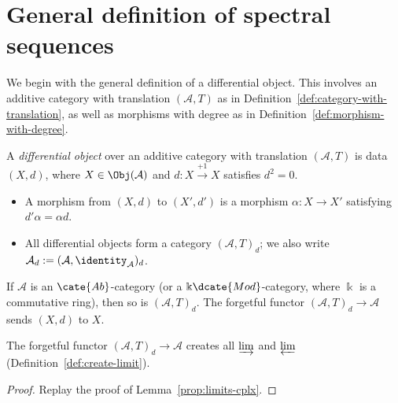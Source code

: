 
\section{General definition of spectral sequences}\label{sec:spectral-sequence}
\hypertarget{o014.aljabr2.chapter5.general-spectral-sequences}{ }

We begin with the general definition of a differential object. This involves an
additive category with translation $(\mathcal{A},T)$ as in
Definition~\ref{def:category-with-translation}, as well as morphisms with
degree as in Definition~\ref{def:morphism-with-degree}.

\begin{definition}\label{def:differential-object}
	A \emph{differential object} over an additive category with translation
	$(\mathcal{A},T)$ is data $(X,d)$, where $X\in\Obj(\mathcal{A})$ and
	$d:X\xrightarrow{+1}X$ satisfies $d^2=0$.
	\begin{itemize}
		\item A morphism from $(X,d)$ to $(X',d')$ is a morphism
		$\alpha:X\to X'$ satisfying $d'\alpha=\alpha d$.
		\item All differential objects form a category $(\mathcal{A},T)_d$;
		we also write
		$\mathcal{A}_d:=(\mathcal{A},\identity_{\mathcal{A}})_d$.
	\end{itemize}
\end{definition}

If $\mathcal{A}$ is an $\cate{Ab}$-category (or a
$\Bbbk\dcate{Mod}$-category, where $\Bbbk$ is a commutative ring), then so is
$(\mathcal{A},T)_d$. The forgetful functor
$(\mathcal{A},T)_d\to\mathcal{A}$ sends $(X,d)$ to $X$.

\begin{proposition}
	The forgetful functor $(\mathcal{A},T)_d\to\mathcal{A}$ creates all
	$\varinjlim$ and $\varprojlim$ (Definition~\ref{def:create-limit}).
\end{proposition}
\begin{proof}
	Replay the proof of Lemma~\ref{prop:limits-cplx}.
\end{proof}

